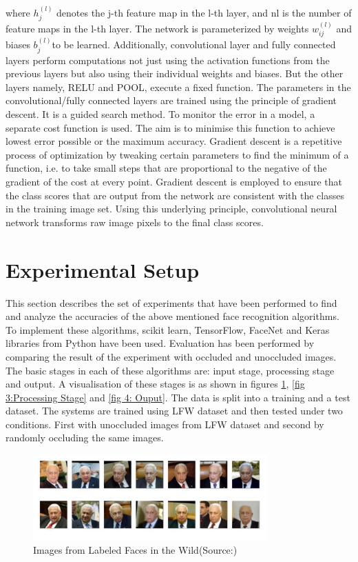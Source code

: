 \documentclass[conference]{IEEEtran}
\begin{document}
where $h^{(l)}_j$ denotes the j-th feature map in the l-th layer, and nl is the number of feature maps in the l-th layer. The network is parameterized by weights $w_{ij}^{(l)}$ and biases $b_j^{(l)}$to be learned\cite{lee2009convolutional}.  Additionally, convolutional layer and fully connected layers perform computations not just using the activation functions from the previous layers but also using their individual weights and biases. But the other layers namely, RELU and POOL, execute a  fixed function. The parameters in the convolutional/fully connected layers are trained using the principle of gradient descent. It is a guided search method. To monitor the error in a model, a separate cost function is used. The aim is to minimise this function to achieve lowest error possible or the maximum accuracy. Gradient descent is a repetitive process of optimization by tweaking certain parameters to find the minimum of a function, i.e. to take small steps that are proportional to the negative of the gradient of the cost at every point. Gradient descent is employed to ensure that the class scores that are output from the network are consistent with the classes in the training image set. Using this underlying principle, convolutional neural network transforms raw image pixels to the final class scores. 



\section{Experimental Setup}
\label{sec:4 Experimental Setup} 


This section describes the set of experiments that have been performed to find and analyze the accuracies of the above mentioned face recognition algorithms. To implement these algorithms, scikit learn, TensorFlow, FaceNet \cite{schroff2015facenet} and Keras libraries from Python have been used. Evaluation has been performed by comparing the result of the experiment with occluded and unoccluded images. The basic stages in each of these algorithms are: input stage, processing stage and output. A visualisation of these stages is as shown in figures \ref{fig 2: dataset}, \ref{fig 3:Processing Stage} and \ref{fig 4: Ouput}. The data is split into a training and a test dataset. The systems are trained using LFW dataset and then tested under two conditions. First with unoccluded images from LFW dataset and second by randomly occluding the same images.

\begin{figure}[h!]
 \centering
 \includegraphics[width = 9cm]{dataset.pdf}
  \caption{ Images from Labeled Faces in the Wild(Source:\cite{LFWTech})}
 \label{fig 2: dataset}
\end{figure}
\end{document}
